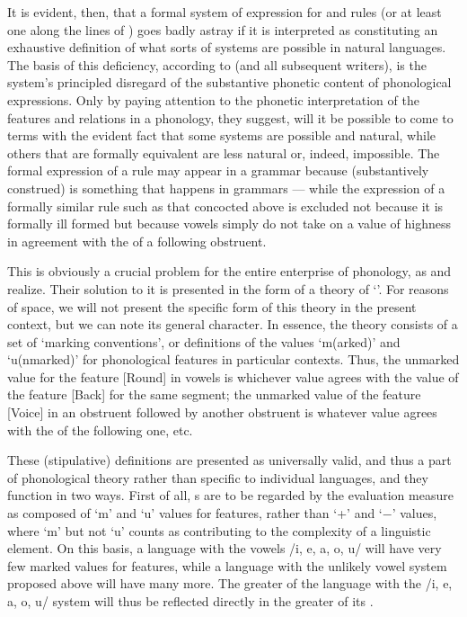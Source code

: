 It is evident, then, that a formal system of expression for
 and rules (or at least one along the
lines of \textsl{}) goes badly astray if it is interpreted as
constituting an exhaustive definition of what sorts of systems are
possible in natural languages. The basis of this deficiency, according
to \citeauthor{spe} (and all subsequent writers), is the system's
principled disregard of the substantive phonetic content of
phonological expressions. Only by paying attention to the phonetic
interpretation of the features and relations in a phonology, they
suggest, will it be possible to come to terms with the evident fact
that some systems are possible and natural, while others that are
formally equivalent are less natural or, indeed, impossible. The
formal expression of a   rule may appear in a
grammar because   (substantively construed) is
something that happens in grammars --- while the expression of a
formally similar rule such as that concocted above is excluded not
because it is formally ill formed but because vowels simply do not
take on a value of highness in agreement with the  of a
following obstruent.

This is obviously a crucial problem for the entire enterprise of
\textsl{} phonology, as {\Chomsky} and {\Halle} realize. Their solution
to it is presented in the form of a theory of `'. For
reasons of space, we will not present the specific form of this theory
in the present context, but we can note its general character. In
essence, the theory consists of a set of `marking conventions', or
definitions of the values `m(arked)' and `u(nmarked)' for phonological
features in particular contexts. Thus, the unmarked value for the
feature [Round] in vowels is whichever value agrees with the value of
the feature [Back] for the same segment; the unmarked value of the
feature [Voice] in an obstruent followed by another obstruent is
whatever value agrees with the  of the following one, etc.

These (stipulative) definitions are presented as universally valid,
and thus a part of phonological theory rather than specific to
individual languages, and they function in two ways. First of all,
s are to be regarded by the evaluation
measure as composed of `m' and `u' values for features, rather than
`+' and `$-$' values, where `m' but not `u' counts as contributing to
the complexity of a linguistic element. On this basis, a language with
the vowels /i, e, a, o, u/ will have very few marked values for
features, while a language with the unlikely vowel system proposed
above will have many more. The greater  of the language
with the /i, e, a, o, u/ system will thus be reflected directly in the
greater  of its .

